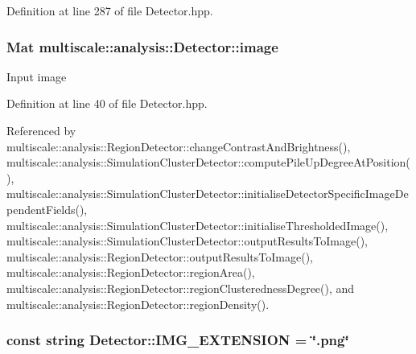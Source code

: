 \-Definition at line 287 of file \-Detector.\-hpp.

\hypertarget{classmultiscale_1_1analysis_1_1Detector_a523830a6cfe409694ce8327c3c736fbd}{
\subsubsection[{image}]{\setlength{\rightskip}{0pt plus 5cm}\-Mat {\bf multiscale\-::analysis\-::\-Detector\-::image}}}\label{classmultiscale_1_1analysis_1_1Detector_a523830a6cfe409694ce8327c3c736fbd}
\-Input image 

\-Definition at line 40 of file \-Detector.\-hpp.



\-Referenced by multiscale\-::analysis\-::\-Region\-Detector\-::change\-Contrast\-And\-Brightness(), multiscale\-::analysis\-::\-Simulation\-Cluster\-Detector\-::compute\-Pile\-Up\-Degree\-At\-Position(), multiscale\-::analysis\-::\-Simulation\-Cluster\-Detector\-::initialise\-Detector\-Specific\-Image\-Dependent\-Fields(), multiscale\-::analysis\-::\-Simulation\-Cluster\-Detector\-::initialise\-Thresholded\-Image(), multiscale\-::analysis\-::\-Simulation\-Cluster\-Detector\-::output\-Results\-To\-Image(), multiscale\-::analysis\-::\-Region\-Detector\-::output\-Results\-To\-Image(), multiscale\-::analysis\-::\-Region\-Detector\-::region\-Area(), multiscale\-::analysis\-::\-Region\-Detector\-::region\-Clusteredness\-Degree(), and multiscale\-::analysis\-::\-Region\-Detector\-::region\-Density().

\hypertarget{classmultiscale_1_1analysis_1_1Detector_acc73b4fb215305ffd7f3d6df8807cc5e}{
\subsubsection[{\-I\-M\-G\-\_\-\-E\-X\-T\-E\-N\-S\-I\-O\-N}]{\setlength{\rightskip}{0pt plus 5cm}const string {\bf \-Detector\-::\-I\-M\-G\-\_\-\-E\-X\-T\-E\-N\-S\-I\-O\-N} = \char`\"{}.png\char`\"{}}}\label{classmultiscale_1_1analysis_1_1Detector_acc73b4fb215305ffd7f3d6df8807cc5e}



